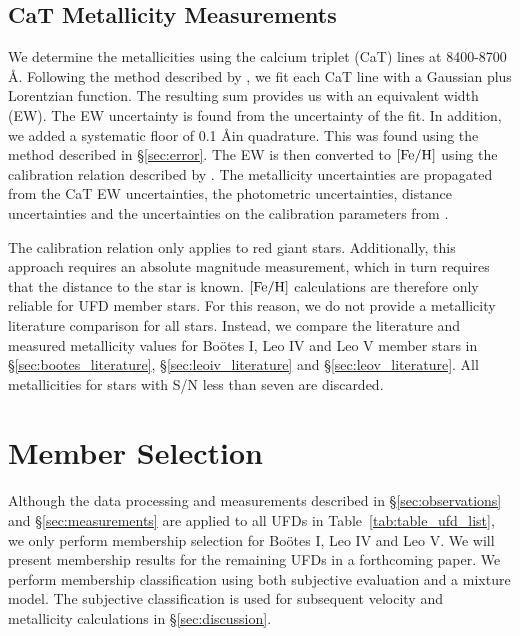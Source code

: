 \documentclass[twocolumn]{aastex63}
\newcommand{\revise}[1]{#1}
\begin{document}
\subsection{CaT Metallicity Measurements} 
\label{sec:metallicity}
We determine the metallicities using the calcium triplet (CaT) lines at 8400-8700 \AA. Following the method described by \citet{li2019}, we fit each CaT line with a Gaussian plus Lorentzian function. The resulting sum provides us with an equivalent width (EW). \revise{The EW uncertainty is found from the uncertainty of the fit. In addition, we added a systematic floor of 0.1 \AA in quadrature. This was found using the method described in \S\ref{sec:error}.} The EW is then converted to $\rm[Fe/H]$ using the calibration relation described by \citet{car2013}. The metallicity uncertainties are \revise{propagated from} the CaT EW uncertainties, the photometric uncertainties, distance uncertainties and the uncertainties on the calibration parameters from \citet{car2013}. 

The calibration relation only applies to red giant stars. Additionally, this approach requires an absolute magnitude measurement, which in turn requires that the distance to the star is known. $\rm[Fe/H]$ calculations are therefore only reliable for UFD member stars. For this reason, we do not provide a metallicity literature comparison for all stars. Instead, we compare the literature and measured metallicity values for Bo{\"o}tes I, Leo IV and Leo V member stars in \S\ref{sec:bootes_literature}, \S\ref{sec:leoiv_literature} and \S\ref{sec:leov_literature}. All metallicities for stars with S/N less than seven are discarded.


\section{Member Selection}
\label{sec:members}

Although the data processing and measurements described in \S\ref{sec:observations} and \S\ref{sec:measurements} are applied to all UFDs in Table~\ref{tab:table_ufd_list}, we only perform membership selection for Bo{\"o}tes I, Leo IV and Leo V. We will present membership results for the remaining UFDs in a forthcoming paper. We perform membership classification using both subjective evaluation and a mixture model. The subjective classification is used for subsequent velocity and metallicity calculations in \S\ref{sec:discussion}.
\end{document}
